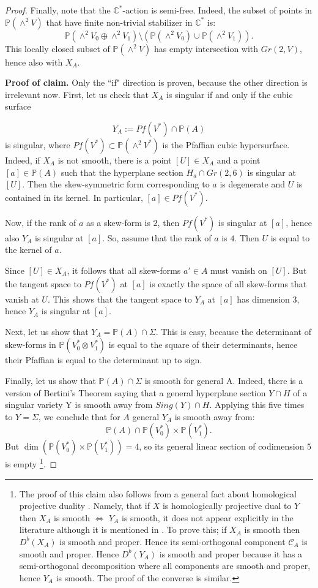 \documentclass[12pt]{article}
\begin{document}
\begin{proof}
Finally, note that the $\mathbb{C}^*$-action is semi-free. Indeed,
the subset of points in $\mathbb{P}(\wedge^2V)$ that have finite non-trivial
stabilizer in $\mathbb{C}^*$ is: $$\mathbb{P}(\wedge^2V_0 \oplus \wedge^2V_1) \setminus (\mathbb{P}(\wedge^2V_0) \cup \mathbb{P}(\wedge^2V_1)).$$ This locally closed subset of $\mathbb{P}(\wedge^2V)$
has empty intersection with $Gr(2,V)$, hence also with $X_A$.

\textbf{Proof of claim.} Only the ``if" direction is proven,
because the other direction is irrelevant now. First, let us check that $X_A$ is singular if and only if
the cubic surface

$$Y_A := Pf(V^*) \cap \mathbb{P}(A)$$
is singular, where $Pf(V^*) \subset \mathbb{P}(\wedge^2V^*)$ is
the Pfaffian cubic hypersurface. Indeed, if $X_A$ is not
smooth, there is a point $[U] \in X_A$ and a point $[a] \in \mathbb{P}(A)$
such that the hyperplane section $H_a \cap Gr(2,6)$ is singular
at $[U]$. Then the skew-symmetric form corresponding to $a$ is
degenerate and $U$ is contained in its kernel. In particular,
$[a] \in Pf(V^*)$.

Now, if the rank of $a$ as a skew-form is $2$, then $Pf(V^*)$
is singular at $[a]$, hence also $Y_A$ is singular at $[a]$.
So, assume that the rank of $a$ is $4$. Then $U$ is equal
to the kernel of $a$.

Since $[U] \in X_A$, it follows that all skew-forms $a' \in A$
must vanish on $[U]$. But the tangent space to $Pf(V^*)$ at $[a]$
is exactly the space of all skew-forms that vanish at $U$.
This shows that the tangent space to $Y_A$ at $[a]$ has
dimension 3, hence $Y_A$ is singular at $[a]$.

Next, let us show that $Y_A = \mathbb{P}(A) \cap \Sigma$. This is easy,
because the determinant of skew-forms in $\mathbb{P}(V_0^* \otimes V_1^*)$
is equal to the square of their determinants, hence their
Pfaffian is equal to the determinant up to sign.

Finally, let us show that $\mathbb{P}(A) \cap \Sigma$ is smooth
for general A. Indeed, there is a version of Bertini's
Theorem saying that a general hyperplane section $Y \cap H$
of a singular variety Y is smooth away from $Sing(Y) \cap H$.
Applying this five times to $Y = \Sigma$, we conclude that
for $A$ general $Y_A$ is smooth away from:
$$\mathbb{P}(A) \cap \mathbb{P}(V_0^*) \times \mathbb{P}(V_1^*).$$
But $\dim(\mathbb{P}(V_0^*) \times \mathbb{P}(V_1^*)) = 4$, so its general
linear section of codimension $5$ is empty \footnote{
The proof of this claim also follows from a general fact about homological projective duality \cite[Theorem 6.3]{Ku2}. Namely, that if $X$ is homologically projective dual to $Y$ then $X_{A}$ is smooth $\iff$ $Y_{A}$ is smooth, it does not appear explicitly in the literature although it is mentioned in \cite[Page 642]{Ku2}. To prove this; if $X_{A}$ is smooth then $D^{b}(X_A)$ is smooth and proper. Hence its semi-orthogonal component $\mathcal{C}_{A}$ is smooth and proper. Hence $D^{b}(Y_A)$ is smooth and proper because it has a semi-orthogonal decomposition where all components are smooth and proper, hence $Y_{A}$ is smooth. The proof of the converse is similar. }.


\end{proof}
\end{document}

